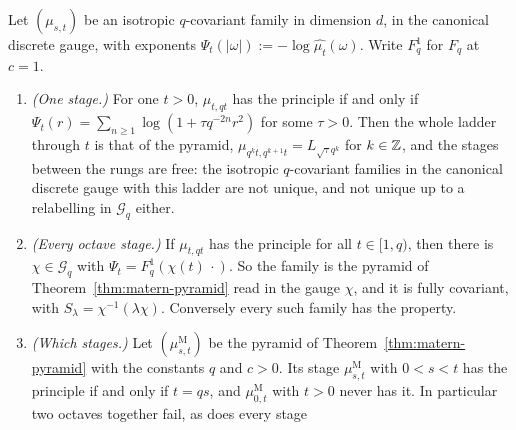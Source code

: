 \begin{theorem}
\label{thm:selection-stratum-two}
\leanok
{}
Let $(\mu_{s,t})$ be an isotropic $q$-covariant family in dimension $d$, in the canonical discrete
gauge, with exponents $\Psi_t(|\omega|) := -\log\widehat{\mu_t}(\omega)$. Write $F^1_q$ for $F_q$ at
$c = 1$.
\begin{enumerate}
\item \emph{(One stage.)} For one $t > 0$, $\mu_{t,qt}$ has the principle if and only if
$\Psi_t(r) = \sum_{n \ge 1}\log(1 + \tau q^{-2n}r^2)$ for some $\tau > 0$. Then the whole ladder
through $t$ is that of the \Matern{} pyramid, $\mu_{q^kt,q^{k+1}t} = L_{\sqrt\tau q^k}$ for
$k \in \mathbb{Z}$, and the stages between the rungs are free: the isotropic $q$-covariant families in
the canonical discrete gauge with this ladder are not unique, and not unique up to a relabelling in
$\mathcal{G}_q$ either.
\item \emph{(Every octave stage.)} If $\mu_{t,qt}$ has the principle for all $t \in [1, q)$, then
there is $\chi \in \mathcal{G}_q$ with $\Psi_t = F^1_q(\chi(t)\,\cdot)$. So the family is the
\Matern{} pyramid of Theorem~\ref{thm:matern-pyramid} read in the gauge $\chi$, and it is fully
covariant, with $S_\lambda = \chi^{-1}(\lambda\chi)$. Conversely every such family has the
property.
\item \emph{(Which stages.)} Let $(\mu^{\mathrm M}_{s,t})$ be the \Matern{} pyramid of
Theorem~\ref{thm:matern-pyramid} with the constants $q$ and $c > 0$. Its stage
$\mu^{\mathrm M}_{s,t}$ with $0 < s < t$ has the principle if and only if $t = qs$, and
$\mu^{\mathrm M}_{0,t}$ with $t > 0$ never has it. In particular two octaves together fail, as does every stage

\end{enumerate}
\end{theorem}
